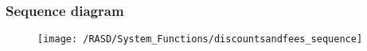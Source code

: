 \newpage
\subsubsection{Sequence diagram}
\begin{figure}[!ht]
  \centering
  \vspace{0.2cm}
  \texttt{[image: /RASD/System\_Functions/discountsandfees\_sequence]}\\
  \vspace{0.1cm}
  \label{fig:discountsandfees_sequence} 
\end{figure}

